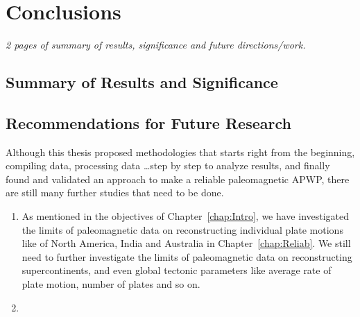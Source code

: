 \chapter{Conclusions}\label{chap:Concl}
\textit{2 pages of summary of results, significance and future
directions/work.}
\vfill
\minitoc\newpage

\section{Summary of Results and Significance}

\section{Recommendations for Future Research}

Although this thesis proposed methodologies that starts right from the
beginning, compiling data, processing data \ldots step by step to analyze results,
and finally found and validated an approach to make a reliable paleomagnetic
APWP, there are still many further studies that need to be done.
%
\begin{enumerate}
  \item As mentioned in the objectives of Chapter~\ref{chap:Intro}, we have
  investigated the limits of paleomagnetic data on reconstructing individual
  plate motions like of North America, India and Australia in
  Chapter~\ref{chap:Reliab}. We still need to further investigate the limits of
  paleomagnetic data on reconstructing supercontinents, and even global tectonic
  parameters like average rate of plate motion, number of plates and so on.
  \item 
\end{enumerate}
